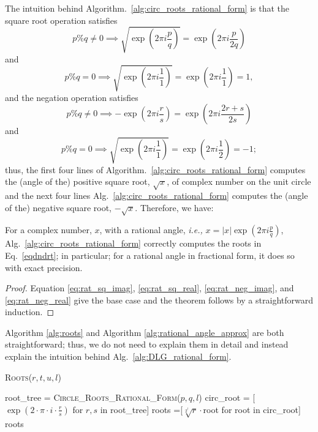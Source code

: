 \documentclass[sigconf]{acmart}
\begin{document}
The intuition behind Algorithm.~\ref{alg:circ_roots_rational_form} is that the square root operation satisfies
\begin{equation}\label{eq:rat_sq_imag}
p \% q \neq  0 \implies   \sqrt{\exp \left(2 \pi i \frac{p}{q}\right)}  = \exp \left(2 \pi i \frac{p}{2q}\right)
\end{equation}
and
\begin{equation}\label{eq:rat_sq_real}
p \% q = 0 \implies   \sqrt{\exp \left(2 \pi i \frac{1}{1}\right)}  = \exp \left(2 \pi i \frac{1}{1}\right) = 1,
\end{equation}
and the negation operation satisfies
\begin{equation}\label{eq:rat_neg_imag}
p \% q \neq  0 \implies   -\exp \left(2 \pi i \frac{r}{s}\right)  = \exp \left(2 \pi i \frac{2r+s} {2s}\right)
\end{equation}
and
\begin{equation}\label{eq:rat_neg_real}
p \% q = 0 \implies   \sqrt{\exp \left(2 \pi i \frac{1}{1}\right)}  = \exp \left(2 \pi i \frac{1}{2}\right) = -1;
\end{equation}
thus, the first four lines of Algorithm.~\ref{alg:circ_roots_rational_form} computes the (angle of the) positive square root, $\sqrt{x}$, of complex number on the unit circle and the next four lines Alg.~\ref{alg:circ_roots_rational_form} computes the (angle of the) negative square root, $-\sqrt{x}$. Therefore, we have:
\begin{theorem}\label{thm:rat_root_correctness}
  For a complex number, $x$, with a rational angle, \emph{i.e.,} $x = |x|\exp \left(2 \pi i \frac{p}{q}\right)$, Alg.~\ref{alg:circ_roots_rational_form} correctly computes the roots in Eq.~\ref{eqdndrt}; in particular; for a rational angle in fractional form, it does so with exact precision.
\end{theorem}
\begin{proof}
Equation \ref{eq:rat_sq_imag}, \ref{eq:rat_sq_real}, \ref{eq:rat_neg_imag}, and \ref{eq:rat_neg_real} give the base case and the theorem follows by a straightforward induction.
\end{proof}

Algorithm \ref{alg:roots} and Algorithm \ref{alg:rational_angle_approx} are both straightforward; thus, we do not need to explain them in detail and instead explain the intuition behind Alg.~\ref{alg:DLG_rational_form}.

\begin{algorithm}
\caption{\textsc{Roots}($r,t,u,l$)}
\label{alg:roots}
\begin{algorithmic}
\STATE root\_tree = \textsc{Circle\_Roots\_Rational\_Form}($p,q,l$)
\STATE circ\_root = [$\exp\left(2\cdot\pi\cdot i \cdot \frac{r}{s}\right)$ for $r,s$ in root\_tree]
\STATE roots =[$\sqrt[2^l]{r}\cdot$root for root in circ\_root]
\RETURN roots
\end{algorithmic}
\end{algorithm}
\end{document}
